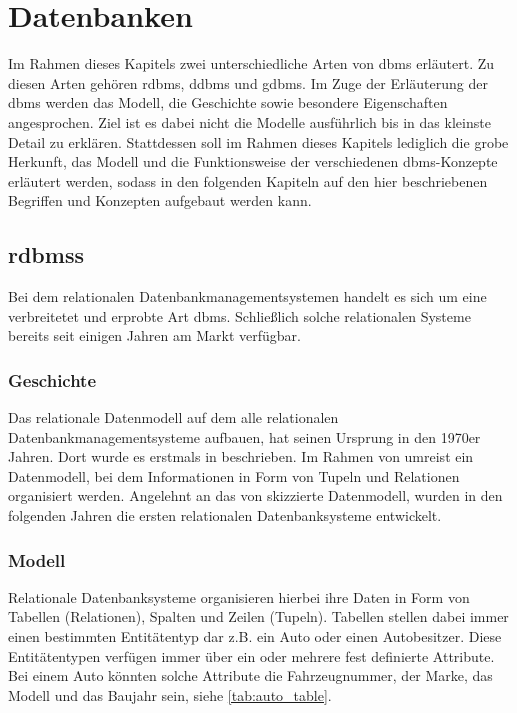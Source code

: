 \chapter{Datenbanken}
Im Rahmen dieses Kapitels zwei unterschiedliche Arten von \acl{dbms} erläutert. Zu diesen Arten gehören \acl{rdbms}, \acl{ddbms} und \acl{gdbms}. Im Zuge der Erläuterung der \acs{dbms} werden das Modell, die Geschichte sowie besondere Eigenschaften angesprochen. Ziel ist es dabei nicht die Modelle ausführlich bis in das kleinste Detail zu erklären. Stattdessen soll im Rahmen dieses Kapitels lediglich die grobe Herkunft, das Modell und die Funktionsweise der verschiedenen \acs{dbms}-Konzepte erläutert werden, sodass in den folgenden Kapiteln auf den hier beschriebenen Begriffen und Konzepten aufgebaut werden kann.   

\section{\acl{rdbms}s}
Bei dem relationalen Datenbankmanagementsystemen handelt es sich um eine verbreitetet und erprobte Art \acs{dbms}. Schließlich solche relationalen Systeme bereits seit einigen Jahren am Markt verfügbar. 

\subsection{Geschichte}
Das relationale Datenmodell auf dem alle relationalen Datenbankmanagementsysteme aufbauen, hat seinen Ursprung in den 1970er Jahren. Dort wurde es erstmals in \cite{codd_relational_model} beschrieben. Im Rahmen von \cite{codd_relational_model} umreist \citeauthor{codd_relational_model} ein Datenmodell, bei dem Informationen in Form von Tupeln und Relationen organisiert werden. Angelehnt an das von \citeauthor{codd_relational_model} skizzierte Datenmodell, wurden in den folgenden Jahren die ersten relationalen Datenbanksysteme entwickelt. 

\subsection{Modell}
Relationale Datenbanksysteme organisieren hierbei ihre Daten in Form von Tabellen (Relationen), Spalten und Zeilen (Tupeln). Tabellen stellen dabei immer einen bestimmten Entitätentyp dar z.B. ein Auto oder einen Autobesitzer. Diese Entitätentypen verfügen immer über ein oder mehrere fest definierte Attribute. Bei einem Auto könnten solche Attribute die Fahrzeugnummer, der Marke, das Modell und das Baujahr sein, siehe \autoref{tab:auto_table}. 

